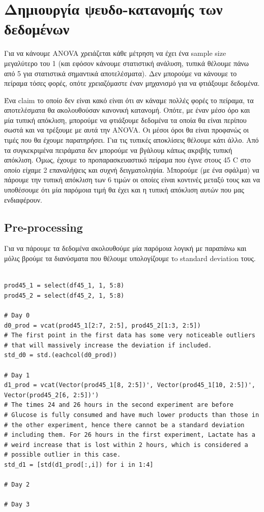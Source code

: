 \documentclass[11pt]{article}
\begin{document}
\section{Δημιουργία ψευδο-κατανομής των δεδομένων}
\label{sec:org5e9d411}
Για να κάνουμε ANOVA χρειάζεται κάθε μέτρηση να έχει ένα sample size μεγαλύτερο του 1 (και εφόσον κάνουμε στατιστική ανάλυση, τυπικά θέλουμε πάνω από 5 για στατιστικά σημαντικά αποτελέσματα). Δεν μπορούμε να κάνουμε το πείραμα τόσες φορές, οπότε χρειαζόμαστε έναν μηχανισμό για να φτιάξουμε δεδομένα.

Ένα claim το οποίο δεν είναι κακό είναι ότι αν κάναμε πολλές φορές το πείραμα, τα αποτελέσματα θα ακολουθούσαν κανονική κατανομή. Οπότε, με έναν μέσο όρο και μία τυπική απόκλιση, μπορούμε να φτιάξουμε δεδομένα τα οποία θα είναι περίπου σωστά και να τρέξουμε με αυτά την ANOVA. Οι μέσοι όροι θα είναι προφανώς οι τιμές που θα έχουμε παρατηρήσει. Για τις τυπικές αποκλίσεις θέλουμε κάτι άλλο. Από τα συγκεκριμένα πειράματα δεν μπορούμε να βγάλουμ κάπως ακριβής τυπική απόκλιση. Όμως, έχουμε το προπαρασκευαστικό πείραμα που έγινε στους 45 C στο οποίο είχαμε 2 επαναλήψεις και συχνή δειγματοληψία. Μπορούμε (με ένα σφάλμα) να πάρουμε την τυπική απόκλιση των 6 τιμών οι οποίες είναι κοντινές μεταξύ τους και να υποθέσουμε ότι μία παρόμοια τιμή θα έχει και η τυπική απόκλιση αυτών που μας ενδιαφέρουν.

\subsection{Pre-processing}
\label{sec:org06f33c9}
Για να πάρουμε τα δεδομένα ακολουθούμε μία παρόμοια λογική με παραπάνω και μόλις βρούμε τα διανύσματα που θέλουμε υπολογίζουμε τo standard deviation τους.

\begin{verbatim}

prod45_1 = select(df45_1, 1, 5:8)
prod45_2 = select(df45_2, 1, 5:8)

# Day 0
d0_prod = vcat(prod45_1[2:7, 2:5], prod45_2[1:3, 2:5])
# The first point in the first data has some very noticeable outliers
# that will massively increase the deviation if included.
std_d0 = std.(eachcol(d0_prod))

# Day 1
d1_prod = vcat(Vector(prod45_1[8, 2:5])', Vector(prod45_1[10, 2:5])', Vector(prod45_2[6, 2:5])')
# The times 24 and 26 hours in the second experiment are before
# Glucose is fully consumed and have much lower products than those in
# the other experiment, hence there cannot be a standard deviation
# including them. For 26 hours in the first experiment, Lactate has a
# weird increase that is lost within 2 hours, which is considered a
# possible outlier in this case.
std_d1 = [std(d1_prod[:,i]) for i in 1:4]

# Day 2

# Day 3
\end{verbatim}
\end{document}
